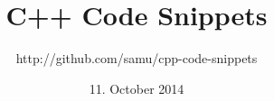 \documentclass{article}
\newcommand{\includeChapter}[1] {
  \newpage
  
}
\begin{document}
  \title{C++ Code Snippets}
  \date{11. October 2014}
  \author{http://github.com/samu/cpp-code-snippets}
  \maketitle

  \newpage

  \tableofcontents
  \newpage

  \includeChapter{terminology}

  \includeChapter{basic_concepts}

  \includeChapter{classes}

  \includeChapter{immutability}

  \includeChapter{streams}

  \includeChapter{iterators}

  \includeChapter{containers}

  \includeChapter{algorithms}

  \includeChapter{bind}

  \includeChapter{templates}

  \includeChapter{references_and_pointers}

  \includeChapter{compile_time_calculation}

  \includeChapter{good_to_know}

  \includeChapter{appendix}
\end{document}
